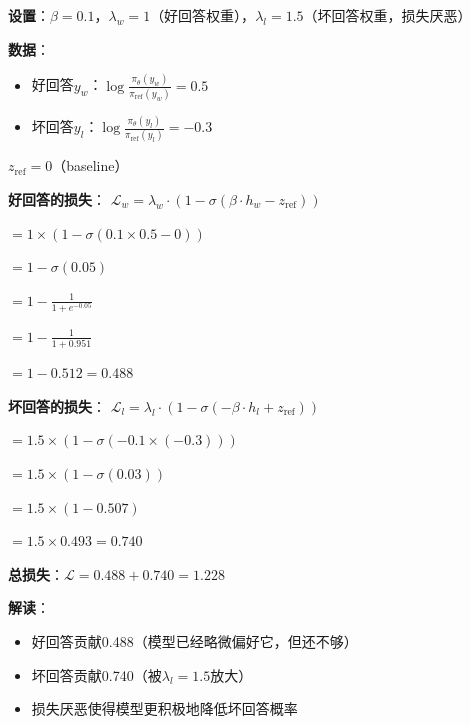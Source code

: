 \documentclass[11pt,a4paper]{article}
\theoremstyle{definition}
\begin{document}
\begin{calculation}
\textbf{设置}：$\beta = 0.1$，$\lambda_w = 1$（好回答权重），$\lambda_l = 1.5$（坏回答权重，损失厌恶）

\textbf{数据}：
\begin{itemize}
    \item 好回答$y_w$：$\log \frac{\pi_\theta(y_w)}{\pi_{\text{ref}}(y_w)} = 0.5$
    \item 坏回答$y_l$：$\log \frac{\pi_\theta(y_l)}{\pi_{\text{ref}}(y_l)} = -0.3$
\end{itemize}

$z_{\text{ref}} = 0$（baseline）

\textbf{好回答的损失}：
$\mathcal{L}_w = \lambda_w \cdot (1 - \sigma(\beta \cdot h_w - z_{\text{ref}}))$

$= 1 \times (1 - \sigma(0.1 \times 0.5 - 0))$

$= 1 - \sigma(0.05)$

$= 1 - \frac{1}{1 + e^{-0.05}}$

$= 1 - \frac{1}{1 + 0.951}$

$= 1 - 0.512 = 0.488$

\textbf{坏回答的损失}：
$\mathcal{L}_l = \lambda_l \cdot (1 - \sigma(-\beta \cdot h_l + z_{\text{ref}}))$

$= 1.5 \times (1 - \sigma(-0.1 \times (-0.3)))$

$= 1.5 \times (1 - \sigma(0.03))$

$= 1.5 \times (1 - 0.507)$

$= 1.5 \times 0.493 = 0.740$

\textbf{总损失}：$\mathcal{L} = 0.488 + 0.740 = 1.228$

\textbf{解读}：
\begin{itemize}
    \item 好回答贡献0.488（模型已经略微偏好它，但还不够）
    \item 坏回答贡献0.740（被$\lambda_l = 1.5$放大）
    \item 损失厌恶使得模型更积极地降低坏回答概率
\end{itemize}
\end{calculation}
\end{document}
